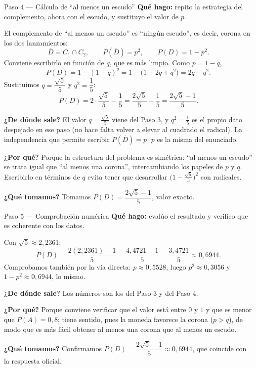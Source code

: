 \documentclass[11pt]{article}
\begin{document}
\begin{paso}{Paso 4 --- Cálculo de ``al menos un escudo''}
\textbf{Qué hago:} repito la estrategia del complemento, ahora con el escudo, y sustituyo el valor de $p$.

El complemento de ``al menos un escudo'' es ``ningún escudo'', es decir, corona en los dos lanzamientos:
\[
\overline{D}=C_1\cap C_2,
\qquad
P(\overline{D})=p^{2},
\qquad
P(D)=1-p^{2}.
\]
Conviene escribirlo en función de $q$, que es más limpio. Como $p=1-q$,
\[
P(D)=1-(1-q)^{2}=1-\bigl(1-2q+q^{2}\bigr)=2q-q^{2}.
\]
Sustituimos $q=\dfrac{\sqrt5}{5}$ y $q^{2}=\dfrac{1}{5}$:
\[
P(D)=2\cdot\frac{\sqrt5}{5}-\frac{1}{5}=\frac{2\sqrt5}{5}-\frac{1}{5}=\frac{2\sqrt5-1}{5}.
\]

\textbf{¿De dónde sale?} El valor $q=\tfrac{\sqrt5}{5}$ viene del Paso 3, y $q^{2}=\tfrac15$ es el propio dato despejado en ese paso (no hace falta volver a elevar al cuadrado el radical). La independencia que permite escribir $P(\overline{D})=p\cdot p$ es la misma del enunciado.

\textbf{¿Por qué?} Porque la estructura del problema es simétrica: ``al menos un escudo'' se trata igual que ``al menos una corona'', intercambiando los papeles de $p$ y $q$. Escribirlo en términos de $q$ evita tener que desarrollar $\bigl(1-\tfrac{\sqrt5}{5}\bigr)^{2}$ con radicales.

\textbf{¿Qué tomamos?} Tomamos $P(D)=\dfrac{2\sqrt5-1}{5}$, valor exacto.
\end{paso}

\begin{paso}{Paso 5 --- Comprobación numérica}
\textbf{Qué hago:} evalúo el resultado y verifico que es coherente con los datos.

Con $\sqrt5\approx 2{,}2361$:
\[
P(D)=\frac{2(2{,}2361)-1}{5}=\frac{4{,}4721-1}{5}=\frac{3{,}4721}{5}\approx 0{,}6944 .
\]
Comprobamos también por la vía directa: $p\approx 0{,}5528$, luego $p^{2}\approx 0{,}3056$ y $1-p^{2}\approx 0{,}6944$, lo mismo.

\textbf{¿De dónde sale?} Los números son los del Paso 3 y del Paso 4.

\textbf{¿Por qué?} Porque conviene verificar que el valor está entre $0$ y $1$ y que es menor que $P(A)=0{,}8$; tiene sentido, pues la moneda favorece la corona ($p>q$), de modo que es más fácil obtener al menos una corona que al menos un escudo.

\textbf{¿Qué tomamos?} Confirmamos $P(D)=\dfrac{2\sqrt5-1}{5}\approx 0{,}6944$, que coincide con la respuesta oficial.
\end{paso}
\end{document}

